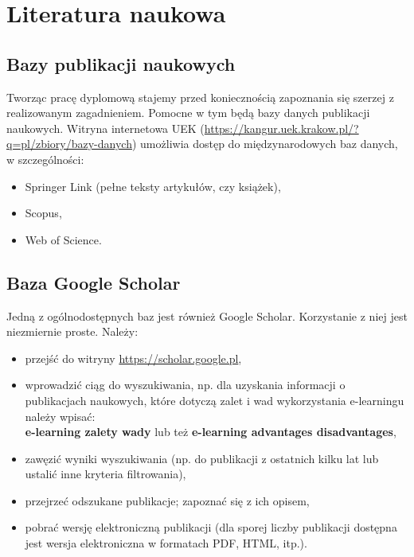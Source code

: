 \chapter{Literatura naukowa}
\label{chap:literatura_naukowa}



\section{Bazy publikacji naukowych}

Tworząc pracę dyplomową stajemy przed koniecznością zapoznania się szerzej z realizowanym zagadnieniem. Pomocne w tym będą bazy danych publikacji naukowych. Witryna internetowa UEK (\url{https://kangur.uek.krakow.pl/?q=pl/zbiory/bazy-danych})
umożliwia dostęp do międzynarodowych baz danych, w szczególności:

\begin{itemize}
	\item Springer Link (pełne teksty artykułów, czy książek),
	\item Scopus,
	\item Web of Science.
\end{itemize}



\section{Baza Google Scholar}

Jedną z ogólnodostępnych baz jest również Google Scholar. Korzystanie z niej jest niezmiernie proste. Należy:

\begin{itemize}
	
	\item przejść do witryny \url{https://scholar.google.pl},
	
	\item wprowadzić ciąg do wyszukiwania, np. dla uzyskania informacji o publikacjach naukowych, które dotyczą zalet i wad wykorzystania e-learningu należy wpisać:\\
	\textbf{e-learning zalety wady} lub też \textbf{e-learning advantages disadvantages},
	
	\item zawęzić wyniki wyszukiwania (np. do publikacji z ostatnich kilku lat lub ustalić inne kryteria filtrowania),
	
	\item przejrzeć odszukane publikacje; zapoznać się z ich opisem,
	
	\item pobrać wersję elektroniczną publikacji (dla sporej liczby publikacji dostępna jest wersja elektroniczna w formatach PDF, HTML, itp.).
	
\end{itemize}


